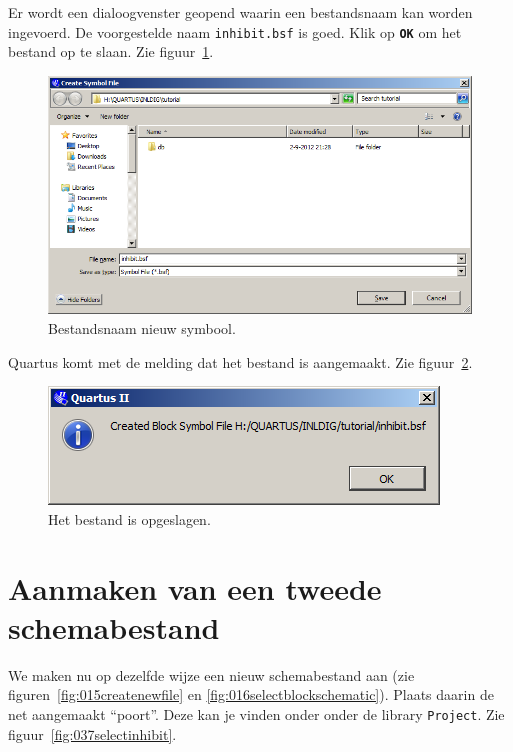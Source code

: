 \documentclass[a4paper,12pt,fleqn,twoside]{book}
\def\tutpicscale{0.455}
\newcommand{\knop}[1]{\texttt{\textbf{#1}}}
\newcommand{\naam}[1]{\texttt{#1}}
\begin{document}
Er wordt een dialoogvenster geopend waarin een bestandsnaam kan worden
ingevoerd. De voorgestelde naam \naam{inhibit.bsf} is goed. Klik op \knop{OK}
om het bestand op te slaan. Zie figuur~\ref{fig:034savefileas}.

\begin{figure}[H]
\centering
\includegraphics[scale=\tutpicscale]{034savefileas}
\caption{Bestandsnaam nieuw symbool.}
\label{fig:034savefileas}
\end{figure}

Quartus komt met de melding dat het bestand is aangemaakt.
Zie figuur~\ref{fig:035bsffilecreated}.

\begin{figure}[H]
\centering
\includegraphics[scale=\tutpicscale]{035bsffilecreated}
\caption{Het bestand is opgeslagen.}
\label{fig:035bsffilecreated}
\end{figure}


\section{Aanmaken van een tweede schemabestand}
\label{sec:aanmakenvaneentweedeschemabestand}
We maken nu op dezelfde wijze een nieuw schemabestand aan (zie
figuren~\ref{fig:015createnewfile} en \ref{fig:016selectblockschematic}).
Plaats daarin de net aangemaakt ``poort''. Deze kan je vinden onder onder
de library \naam{Project}. Zie figuur~\ref{fig:037selectinhibit}.
 
\end{document}
